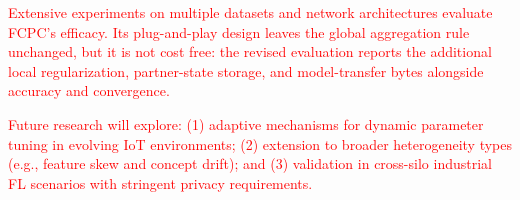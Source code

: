 \documentclass[journal,twoside,web]{ieeecolor}
\newcommand{\rev}[1]{\textcolor{red}{#1}}
\begin{document}
\rev{Extensive experiments on multiple datasets and network architectures evaluate FCPC's efficacy. Its plug-and-play design leaves the global aggregation rule unchanged, but it is not cost free: the revised evaluation reports the additional local regularization, partner-state storage, and model-transfer bytes alongside accuracy and convergence.}

\rev{Future research will explore: (1) adaptive mechanisms for dynamic parameter tuning in evolving IoT environments; (2) extension to broader heterogeneity types (e.g., feature skew and concept drift); and (3) validation in cross-silo industrial FL scenarios with stringent privacy requirements.}




\end{document}
